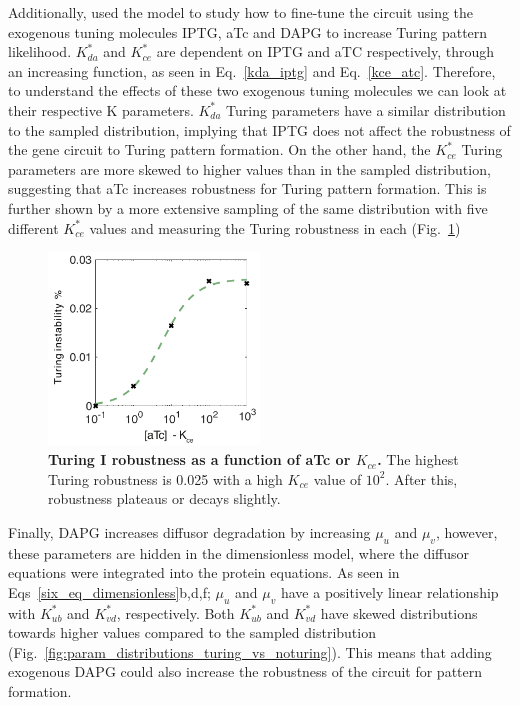 Additionally, used the model to study how to fine-tune the circuit using the exogenous tuning molecules IPTG, aTc and DAPG to increase Turing pattern likelihood.
$K_{da}^*$  and $K_{ce}^*$ are dependent on IPTG and aTC respectively, through an increasing function,
as seen in Eq.~\ref{kda_iptg} and Eq.~\ref{kce_atc}.
Therefore,
to understand the effects of these two exogenous tuning molecules we can look at their respective K parameters.
$K_{da}^*$ Turing parameters have a similar distribution to the sampled distribution,
implying that IPTG does not affect the robustness of the gene circuit to Turing pattern formation.
On the other hand, the $K_{ce}^*$ Turing parameters are more skewed to higher values than in the sampled distribution,
suggesting that aTc increases robustness for Turing pattern formation.
This is further shown by a more extensive sampling of the same distribution with five different $K_{ce}^*$ values
and measuring the Turing robustness in each
(Fig.~\ref{fig:atc_robustness})

\begin{figure}[H] %
    \centering
    \begin{adjustbox}{center}
        \includegraphics[width=0.5\textwidth]{chapters/Chapter 2/atc_robustness} %
    \end{adjustbox}
    \caption{\textbf{Turing I robustness as a function of aTc or $K_{ce}$.} The highest Turing robustness is 0.025 with a high $K_{ce}$ value of $10^2$. After this, robustness plateaus or decays slightly. }
    \label{fig:atc_robustness} %
\end{figure}

Finally, DAPG increases diffusor degradation by increasing $\mu_u$ and $\mu_v$,
however, these parameters are hidden in the dimensionless model,
where the diffusor equations were integrated into the protein equations.
As seen in Eqs~\ref{six_eq_dimensionless}b,d,f; $\mu_u$
and $\mu_v$ have a positively linear relationship with $K_{ub}^*$ and $K_{vd}^*$, respectively.
Both $K_{ub}^*$ and $K_{vd}^*$ have skewed distributions towards higher values compared to the sampled distribution
(Fig.~\ref{fig:param_distributions_turing_vs_noturing}).
This means that adding exogenous DAPG could also increase the robustness of the circuit for pattern formation.

